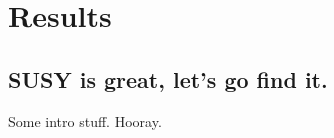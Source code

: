 \chapter{Results}

\ifpdf
    \graphicspath{{Chapter8/Figs/Raster/}{Chapter8/Figs/PDF/}{Chapter8/Figs/}}
\else
    \graphicspath{{Chapter8/Figs/Vector/}{Chapter8/Figs/}}
\fi


\section{SUSY is great, let's go find it.}  %

Some intro stuff. Hooray.